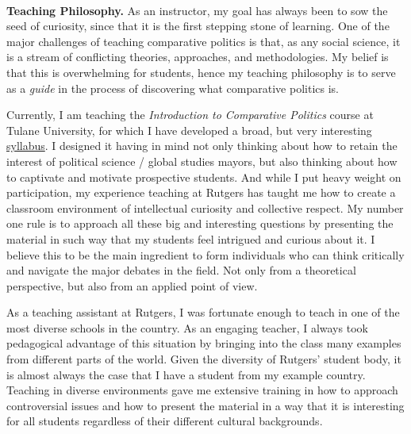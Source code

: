 \vspace{-2cm}{\bf \huge Teaching Statement}\\

{\bf Teaching Philosophy.} As an instructor, my goal has always been to sow the seed of curiosity, since that it is the first stepping stone of learning. One of the major challenges of teaching comparative politics is that, as any social science, it is a stream of conflicting theories, approaches, and methodologies. My belief is that this is overwhelming for students, hence my teaching philosophy is to serve as a \emph{guide} in the process of discovering what comparative politics is.


Currently, I am teaching the \emph{Introduction to Comparative Politics} course at Tulane University, for which I have developed a broad, but very interesting \href{https://github.com/hbahamonde/Comparative_Politics_UGRAD/raw/master/Bahamonde_Comparative_Politics_Syllabus_UGRAD.pdf}{syllabus}. I designed it having in mind not only thinking about how to retain the interest of political science / global studies mayors, but also thinking about how to captivate and motivate prospective students. And while I put heavy weight on participation, my experience teaching at Rutgers has taught me how to create a classroom environment of intellectual curiosity and collective respect. My number one rule is to approach all these big and interesting questions by presenting the material in such way that my students feel intrigued and curious about it. I believe this to be the main ingredient to form individuals who can think critically and navigate the major debates in the field. Not only from a theoretical perspective, but also from an applied point of view.

As a teaching assistant at Rutgers, I was fortunate enough to teach in one of the most diverse schools in the country. As an engaging teacher, I always took pedagogical advantage of this situation by bringing into the class many examples from different parts of the world. Given the diversity of Rutgers' student body, it is almost always the case that I have a student from my example country. Teaching in diverse environments gave me extensive training in how to approach controversial issues and how to present the material in a way that it is interesting for all students regardless of their different cultural backgrounds. 

